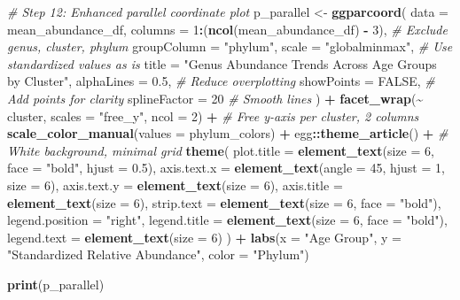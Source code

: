 \documentclass[
]{article}
\newenvironment{Shaded}{\begin{snugshade}}{\end{snugshade}}
\newcommand{\AttributeTok}[1]{\textcolor[rgb]{0.13,0.29,0.53}{#1}}
\newcommand{\CommentTok}[1]{\textcolor[rgb]{0.56,0.35,0.01}{\textit{#1}}}
\newcommand{\ConstantTok}[1]{\textcolor[rgb]{0.56,0.35,0.01}{#1}}
\newcommand{\DecValTok}[1]{\textcolor[rgb]{0.00,0.00,0.81}{#1}}
\newcommand{\FloatTok}[1]{\textcolor[rgb]{0.00,0.00,0.81}{#1}}
\newcommand{\FunctionTok}[1]{\textcolor[rgb]{0.13,0.29,0.53}{\textbf{#1}}}
\newcommand{\NormalTok}[1]{#1}
\newcommand{\OtherTok}[1]{\textcolor[rgb]{0.56,0.35,0.01}{#1}}
\newcommand{\SpecialCharTok}[1]{\textcolor[rgb]{0.81,0.36,0.00}{\textbf{#1}}}
\newcommand{\StringTok}[1]{\textcolor[rgb]{0.31,0.60,0.02}{#1}}
\begin{document}
\begin{Shaded}
\begin{Highlighting}[]
\CommentTok{\# Step 12: Enhanced parallel coordinate plot}
\NormalTok{p\_parallel }\OtherTok{\textless{}{-}} \FunctionTok{ggparcoord}\NormalTok{(}
  \AttributeTok{data =}\NormalTok{ mean\_abundance\_df,}
  \AttributeTok{columns =} \DecValTok{1}\SpecialCharTok{:}\NormalTok{(}\FunctionTok{ncol}\NormalTok{(mean\_abundance\_df) }\SpecialCharTok{{-}} \DecValTok{3}\NormalTok{),  }\CommentTok{\# Exclude genus, cluster, phylum}
  \AttributeTok{groupColumn =} \StringTok{"phylum"}\NormalTok{,}
  \AttributeTok{scale =} \StringTok{"globalminmax"}\NormalTok{,  }\CommentTok{\# Use standardized values as is}
  \AttributeTok{title =} \StringTok{"Genus Abundance Trends Across Age Groups by Cluster"}\NormalTok{,}
  \AttributeTok{alphaLines =} \FloatTok{0.5}\NormalTok{,  }\CommentTok{\# Reduce overplotting}
  \AttributeTok{showPoints =} \ConstantTok{FALSE}\NormalTok{,  }\CommentTok{\# Add points for clarity}
  \AttributeTok{splineFactor =} \DecValTok{20}  \CommentTok{\# Smooth lines}
\NormalTok{) }\SpecialCharTok{+}
  \FunctionTok{facet\_wrap}\NormalTok{(}\SpecialCharTok{\textasciitilde{}}\NormalTok{ cluster, }\AttributeTok{scales =} \StringTok{"free\_y"}\NormalTok{, }\AttributeTok{ncol =} \DecValTok{2}\NormalTok{) }\SpecialCharTok{+}  \CommentTok{\# Free y{-}axis per cluster, 2 columns}
  \FunctionTok{scale\_color\_manual}\NormalTok{(}\AttributeTok{values =}\NormalTok{ phylum\_colors) }\SpecialCharTok{+}
\NormalTok{  egg}\SpecialCharTok{::}\FunctionTok{theme\_article}\NormalTok{() }\SpecialCharTok{+}  \CommentTok{\# White background, minimal grid}
  \FunctionTok{theme}\NormalTok{(}
    \AttributeTok{plot.title =} \FunctionTok{element\_text}\NormalTok{(}\AttributeTok{size =} \DecValTok{6}\NormalTok{, }\AttributeTok{face =} \StringTok{"bold"}\NormalTok{, }\AttributeTok{hjust =} \FloatTok{0.5}\NormalTok{),}
    \AttributeTok{axis.text.x =} \FunctionTok{element\_text}\NormalTok{(}\AttributeTok{angle =} \DecValTok{45}\NormalTok{, }\AttributeTok{hjust =} \DecValTok{1}\NormalTok{, }\AttributeTok{size =} \DecValTok{6}\NormalTok{),}
    \AttributeTok{axis.text.y =} \FunctionTok{element\_text}\NormalTok{(}\AttributeTok{size =} \DecValTok{6}\NormalTok{),}
    \AttributeTok{axis.title =} \FunctionTok{element\_text}\NormalTok{(}\AttributeTok{size =} \DecValTok{6}\NormalTok{),}
    \AttributeTok{strip.text =} \FunctionTok{element\_text}\NormalTok{(}\AttributeTok{size =} \DecValTok{6}\NormalTok{, }\AttributeTok{face =} \StringTok{"bold"}\NormalTok{),}
    \AttributeTok{legend.position =} \StringTok{"right"}\NormalTok{,}
    \AttributeTok{legend.title =} \FunctionTok{element\_text}\NormalTok{(}\AttributeTok{size =} \DecValTok{6}\NormalTok{, }\AttributeTok{face =} \StringTok{"bold"}\NormalTok{),}
    \AttributeTok{legend.text =} \FunctionTok{element\_text}\NormalTok{(}\AttributeTok{size =} \DecValTok{6}\NormalTok{)}
\NormalTok{  ) }\SpecialCharTok{+}
  \FunctionTok{labs}\NormalTok{(}\AttributeTok{x =} \StringTok{"Age Group"}\NormalTok{, }\AttributeTok{y =} \StringTok{"Standardized Relative Abundance"}\NormalTok{, }\AttributeTok{color =} \StringTok{"Phylum"}\NormalTok{)}

\FunctionTok{print}\NormalTok{(p\_parallel)}
\end{Highlighting}
\end{Shaded}
\end{document}
